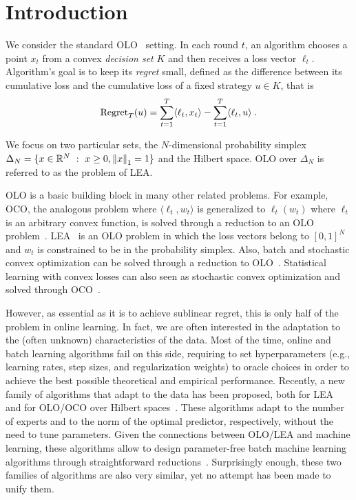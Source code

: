 \section{Introduction}
\label{section:introduction}

We consider the standard \ac{OLO}~\citep{Cesa-BianchiL06,
Shalev-Shwartz12} setting. In each round $t$, an algorithm chooses a point $x_t$ from a convex \emph{decision set}
$K$ and then receives a loss vector $\ell_t$. Algorithm's goal is to keep its
\emph{regret} small, defined as the difference between its cumulative loss and the cumulative loss of a fixed strategy $u \in K$, that is
$$
\operatorname{Regret}_T(u) = \sum_{t=1}^T \langle \ell_t, x_t \rangle - \sum_{t=1}^T \langle \ell_t, u \rangle \; .
$$

We focus on two particular sets, the $N$-dimensional probability simplex
$\Delta_N = \{ x \in \mathbb{R}^N ~:~ x \ge 0, \left\|{x}\right\|_1 = 1\}$ and the Hilbert space.
\ac{OLO} over $\Delta_N$ is referred to as the problem of \ac{LEA}.


\ac{OLO} is a basic building block in many other related problems. For example,
\ac{OCO}, the analogous problem where $\langle \ell_t, w_t \rangle$ is
generalized to $\ell_t(w_t)$ where $\ell_t$ is an arbitrary convex function, is
solved through a reduction to an \ac{OLO} problem~\citep{Shalev-Shwartz12}. \ac{LEA}~\citep{LittlestoneW94, Vovk98, Cesa-BianchiFHHSW97}
is an \ac{OLO} problem in which the loss vectors belong to $[0,1]^N$ and $w_t$
is constrained to be in the probability simplex. Also, batch and stochastic
convex optimization can be solved through a reduction to
\ac{OLO}~\citep{Shalev-Shwartz12}. Statistical learning with convex losses can
also seen as stochastic convex optimization and solved
through \ac{OCO}~\citep{Munro1951}.

However, as essential as it is to achieve sublinear regret, this is only half of
the problem in online learning. In fact, we are often interested in the
adaptation to the (often unknown) characteristics of the data. Most of the time,
online and batch learning algorithms fail on this side, requiring to set
hyperparameters (e.g., learning rates, step sizes, and regularization weights)
to oracle choices in order to achieve the best possible theoretical and
empirical performance. Recently, a new family of algorithms that adapt to the
data has been proposed, both for \ac{LEA}~\citep{ChaudhuriYH09, ChernovV10,
LuoE14, LuoS15, KoolenE15} and for \ac{OLO}/\ac{OCO} over Hilbert
spaces~\citep{StreeterM12, Orabona13, McMahanA13, McMahanO14, Orabona14}. These
algorithms adapt to the number of experts and to the norm of the optimal
predictor, respectively, without the need to tune parameters. Given the
connections between \ac{OLO}/\ac{LEA} and machine learning, these algorithms
allow to design parameter-free batch machine learning algorithms through
straightforward reductions~\citep{Orabona14,LuoS15}.
Surprisingly enough, these two families of algorithms are also
very similar, yet no attempt has been made to unify them.

